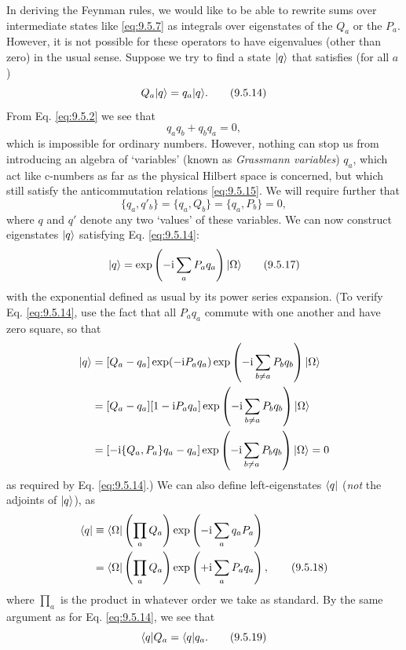In deriving the Feynman rules, we would like to be able to rewrite sums over
intermediate states like \eqref{eq:9.5.7} as integrals over eigenstates of the $Q_a$ or
the $P_a$. However, it is not possible for these operators to have eigenvalues
(other than zero) in the usual sense. Suppose we try to find a state $\lvert q\rangle$
that satisfies (for all $a$)
\begin{equation}
Q_a\lvert q\rangle=q_a\lvert q\rangle.
\tag{9.5.14}\label{eq:9.5.14}
\end{equation}
From Eq. \eqref{eq:9.5.2} we see that
\begin{equation}
q_aq_b+q_bq_a=0,
\tag{9.5.15}\label{eq:9.5.15}
\end{equation}
which is impossible for ordinary numbers. However, nothing can stop us from
introducing an algebra of `variables' (known as \emph{Grassmann variables})
$q_a$, which act like c-numbers as far as the physical Hilbert space is
concerned, but which still satisfy the anticommutation relations \eqref{eq:9.5.15}. We
will require further that
\begin{equation}
\{q_a,q'_b\}=\{q_a,Q_b\}=\{q_a,P_b\}=0,
\tag{9.5.16}\label{eq:9.5.16}
\end{equation}
where $q$ and $q'$ denote any two `values' of these variables. We can now
construct eigenstates $\lvert q\rangle$ satisfying Eq. \eqref{eq:9.5.14}:
\begin{equation}
\lvert q\rangle=\exp\left(-\mathrm{i}\sum_aP_aq_a\right)\lvert \Omega\rangle
\tag{9.5.17}\label{eq:9.5.17}
\end{equation}
with the exponential defined as usual by its power series expansion. (To
verify Eq. \eqref{eq:9.5.14}, use the fact that all $P_aq_a$ commute with one another
and have zero square, so that
\begin{align*}
[Q_a-q_a]\ket{q}
&=[Q_a-q_a]\exp(-\ii P_aq_a)
 \exp\left(-\ii\sum_{b\ne a}P_bq_b\right)\ket{\Omega}\\
&=[Q_a-q_a][1-\ii P_aq_a]
 \exp\left(-\ii\sum_{b\ne a}P_bq_b\right)\ket{\Omega}\\
&=[-\ii\{Q_a,P_a\}q_a-q_a]
 \exp\left(-\ii\sum_{b\ne a}P_bq_b\right)\ket{\Omega}=0
\end{align*}
as required by Eq. \eqref{eq:9.5.14}.) We can also define left-eigenstates $\langle q\rvert$
(\emph{not} the adjoints of $\lvert q\rangle$), as
\begin{align}
\langle q\rvert
&\equiv\langle \Omega\rvert\left(\prod_aQ_a\right)
 \exp\left(-\mathrm{i}\sum_aq_aP_a\right)\notag\\
&=\langle \Omega\rvert\left(\prod_aQ_a\right)
 \exp\left(+\mathrm{i}\sum_aP_aq_a\right),
\tag{9.5.18}\label{eq:9.5.18}
\end{align}
where $\prod_a$ is the product in whatever order we take as standard. By the
same argument as for Eq. \eqref{eq:9.5.14}, we see that
\begin{equation}
\langle q\rvert Q_a=\langle q\rvert q_a.
\tag{9.5.19}\label{eq:9.5.19}
\end{equation}

